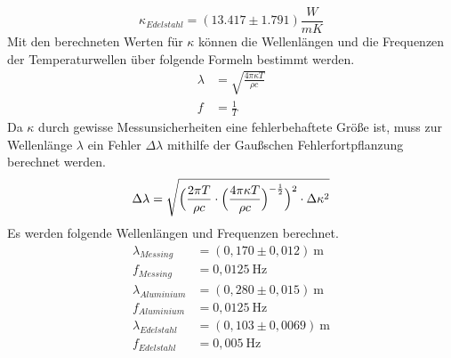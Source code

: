 $$\kappa_{Edelstahl} =(13.417 \pm 1.791) \frac{W}{mK}$$
Mit den berechneten Werten für $\kappa$ können die Wellenlängen und die Frequenzen der Temperaturwellen über folgende Formeln bestimmt werden.
\begin{align*}
\lambda &= \sqrt{ \frac{4 \pi \kappa T}{\rho c}}\\
f &= \frac{1}{T}
\end{align*}
Da $\kappa$ durch gewisse Messunsicherheiten eine fehlerbehaftete Größe ist, muss zur Wellenlänge $\lambda$ ein Fehler $\Delta \lambda$ mithilfe der Gaußschen Fehlerfortpflanzung berechnet werden.
$$\Delta \lambda = \sqrt{\Bigl(\frac{2 \pi T}{\rho c} \cdot \Bigl(\frac{4 \pi \kappa T}{\rho c}\Bigr)^{-\frac{1}{2}}\Bigr)^2 \cdot \Delta \kappa^2} $$
Es werden folgende Wellenlängen und Frequenzen berechnet.
\begin{align*}
  \lambda_{Messing} &= (0,170 \pm 0,012 )\ \text{m}\\
  f_{Messing} &= 0,0125 \ \text{Hz}\\
  \lambda_{Aluminium} &= (0,280 \pm 0,015 ) \ \text{m}\\
  f_{Aluminium} &= 0,0125 \ \text{Hz}\\
  \lambda_{Edelstahl} &= (0,103 \pm 0,0069 ) \ \text{m}\\
  f_{Edelstahl} &= 0,005 \  \text{Hz}
\end{align*}




